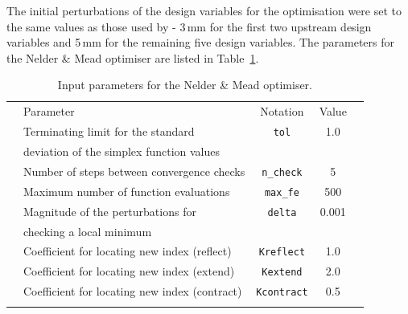 \documentclass[12pt,a4paper]{article}
\begin{document}
The initial perturbations of the design variables for the optimisation were
set to the same values as those used by  - 3\,mm 
for the first two upstream design variables and 5\,mm for the remaining five
design variables. The parameters for the Nelder \& Mead optimiser are listed 
in Table~\ref{t:params-Nelder-Mead-opt}.
%
\begin{table}[htbp]
 \begin{small}
  \begin{center}
  \caption{Input parameters for the Nelder \& Mead optimiser.}
  \label{t:params-Nelder-Mead-opt}
  \vspace{2mm}
  \begin{tabular}{@{}c@{}@{}l@{}@{}c@{}@{}c@{}@{}c@{}@{}}
  \hline\hline\noalign{\smallskip}
  \hspace{5mm}   &  Parameter     &   \hspace{5mm} Notation \hspace{5mm}    &   Value    & \hspace{5mm}    \\
  \noalign{\smallskip}\hline\noalign{\smallskip}
  & Terminating limit for the standard                      & \texttt{tol}        &    1.0    &  \\
  & deviation of the simplex function values                &                     &           &  \\ \noalign{\smallskip}
  & Number of steps between convergence checks \hspace{5mm} & \texttt{n\_check}   &    5      &  \\ \noalign{\smallskip}
  & Maximum number of function evaluations                  & \texttt{max\_fe}    &    500    &  \\ \noalign{\smallskip}
  & Magnitude of the perturbations for                      & \texttt{delta}      &    0.001  &  \\ 
  & checking a local minimum                                &                     &           &  \\ \noalign{\smallskip}
  & Coefficient for locating new index (reflect)            & \texttt{Kreflect}   &    1.0    &  \\ \noalign{\smallskip}
  & Coefficient for locating new index (extend)             & \texttt{Kextend}    &    2.0    &  \\ \noalign{\smallskip}
  & Coefficient for locating new index (contract)           & \texttt{Kcontract}  &    0.5    &  \\
  \noalign{\smallskip}\hline\hline
  \end{tabular}
  \end{center}
 \end{small}
\end{table}
%
\end{document}
